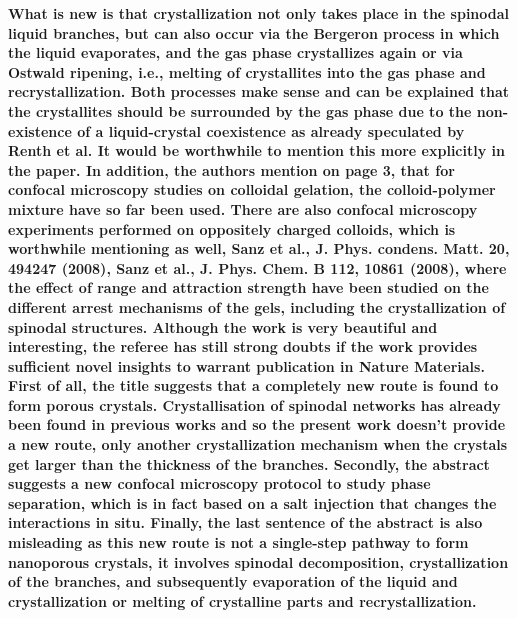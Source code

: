 \documentclass[11pt,a4paper]{article}
\newenvironment{referee}%
{\bigskip\singlespacing\bf}%
{\par\bigskip}
\begin{document}
\begin{referee}
What is new is that crystallization not only takes place in the spinodal liquid branches, but can also occur via the Bergeron process in which the liquid evaporates, and the gas phase crystallizes again or via Ostwald ripening, i.e., melting of crystallites into the gas phase and recrystallization. Both processes make sense and can be explained that the crystallites should be surrounded by the gas phase due to the non-existence of a liquid-crystal coexistence as already speculated by Renth et al. It would be worthwhile to mention this more explicitly in the paper. In addition, the authors mention on page 3, that for confocal microscopy studies on colloidal gelation, the colloid-polymer mixture have so far been used. There are also confocal microscopy experiments performed on oppositely charged colloids,
which is worthwhile mentioning as well, Sanz et al., J. Phys. condens. Matt. 20, 494247 (2008), Sanz et al., J. Phys. Chem. B 112, 10861 (2008), where the effect of range and attraction strength have been studied on the different arrest mechanisms of the gels, including the crystallization of spinodal structures. Although the work is very beautiful and interesting, the referee has still strong doubts if the work provides sufficient novel insights to warrant publication in Nature Materials. First of all, the title suggests that a completely new route is found to form porous crystals. Crystallisation of spinodal networks has already been found in previous works and so the present work doesn't provide a new route, only another crystallization mechanism when the crystals get larger than the thickness of the branches. Secondly, the abstract suggests a new confocal microscopy protocol to study phase separation, which is in fact based on a salt injection that changes the interactions in
situ. Finally, the last sentence of the abstract is also misleading as this new route is not a single-step pathway to form nanoporous crystals, it involves spinodal decomposition, crystallization of the branches, and subsequently evaporation of the liquid and crystallization or melting of crystalline parts and recrystallization.
\end{referee}
\end{document}

